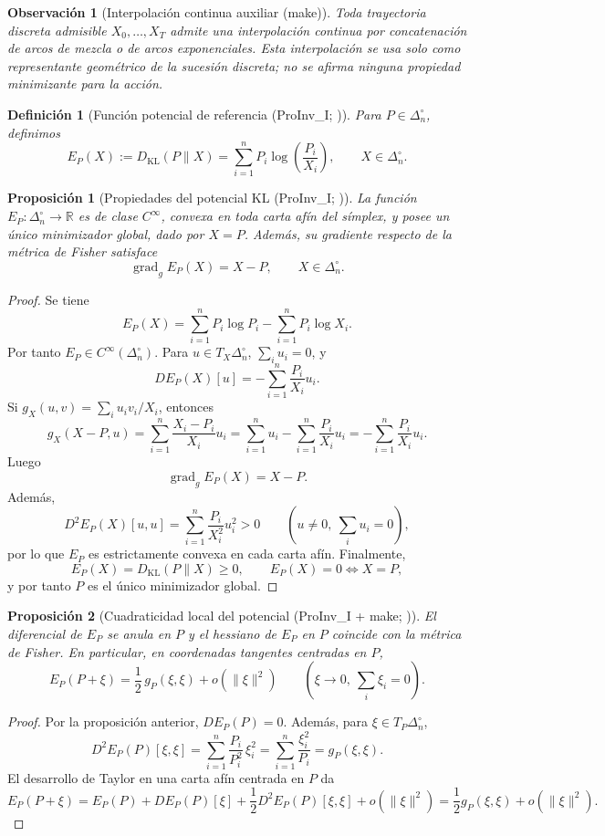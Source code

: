 ﻿\documentclass[12pt]{article}
\newcommand{\fuente}[1]{\textnormal{(#1)}}
\newcommand{\fuentecite}[2]{\textnormal{(#1; \citealp{#2})}}
\newcommand{\fuentemakecite}[2]{\textnormal{(#1 + make; \citealp{#2})}}
\newtheorem{definicion}{Definición}[section]
\newtheorem{proposicion}{Proposición}[section]
\newtheorem{observacion}{Observación}[section]
\begin{document}
\begin{observacion}[Interpolación continua auxiliar \fuente{make}]
Toda trayectoria discreta admisible \(X_0,\dots,X_T\) admite una interpolación continua por concatenación de arcos de mezcla o de arcos exponenciales. Esta interpolación se usa solo como representante geométrico de la sucesión discreta; no se afirma ninguna propiedad minimizante para la acción.
\end{observacion}

\begin{definicion}[Función potencial de referencia \fuentecite{ProInv\_I}{ControlInformacional2026}]
Para \(P\in\Delta_n^\circ\), definimos
\[
E_P(X):=D_{\mathrm{KL}}(P\|X)
=\sum_{i=1}^n P_i\log\!\left(\frac{P_i}{X_i}\right),
\qquad X\in\Delta_n^\circ.
\]
\end{definicion}

\begin{proposicion}[Propiedades del potencial KL \fuentecite{ProInv\_I}{ControlInformacional2026}]
La función \(E_P:\Delta_n^\circ\to\mathbb R\) es de clase \(C^\infty\), convexa en toda carta afín del símplex, y posee un único minimizador global, dado por \(X=P\). Además, su gradiente respecto de la métrica de Fisher satisface
\[
\operatorname{grad}_g E_P(X)=X-P,
\qquad X\in\Delta_n^\circ.
\]
\end{proposicion}
\begin{proof}
Se tiene
\[
E_P(X)=\sum_{i=1}^n P_i\log P_i-\sum_{i=1}^n P_i\log X_i.
\]
Por tanto \(E_P\in C^\infty(\Delta_n^\circ)\). Para \(u\in T_X\Delta_n^\circ\), \(\sum_i u_i=0\), y
\[
DE_P(X)[u]=-\sum_{i=1}^n \frac{P_i}{X_i}u_i.
\]
Si \(g_X(u,v)=\sum_i u_iv_i/X_i\), entonces
\[
g_X(X-P,u)=\sum_{i=1}^n \frac{X_i-P_i}{X_i}u_i
=\sum_{i=1}^n u_i-\sum_{i=1}^n \frac{P_i}{X_i}u_i
=-\sum_{i=1}^n \frac{P_i}{X_i}u_i.
\]
Luego
\[
\operatorname{grad}_g E_P(X)=X-P.
\]
Además,
\[
D^2E_P(X)[u,u]=\sum_{i=1}^n \frac{P_i}{X_i^2}u_i^2>0
\qquad(u\neq 0,\ \sum_i u_i=0),
\]
por lo que \(E_P\) es estrictamente convexa en cada carta afín. Finalmente,
\[
E_P(X)=D_{\mathrm{KL}}(P\|X)\ge 0,
\qquad
E_P(X)=0\iff X=P,
\]
y por tanto \(P\) es el único minimizador global.
\end{proof}

\begin{proposicion}[Cuadraticidad local del potencial \fuentemakecite{ProInv\_I}{ControlInformacional2026}]
El diferencial de \(E_P\) se anula en \(P\) y el hessiano de \(E_P\) en \(P\) coincide con la métrica de Fisher. En particular, en coordenadas tangentes centradas en \(P\),
\[
E_P(P+\xi)=\frac12\,g_P(\xi,\xi)+o(\|\xi\|^2)
\qquad (\xi\to 0,\ \sum_i \xi_i=0).
\]
\end{proposicion}
\begin{proof}
Por la proposición anterior, \(DE_P(P)=0\). Además, para \(\xi\in T_P\Delta_n^\circ\),
\[
D^2E_P(P)[\xi,\xi]
=\sum_{i=1}^n \frac{P_i}{P_i^2}\,\xi_i^2
=\sum_{i=1}^n \frac{\xi_i^2}{P_i}
=g_P(\xi,\xi).
\]
El desarrollo de Taylor en una carta afín centrada en \(P\) da
\[
E_P(P+\xi)
=E_P(P)+DE_P(P)[\xi]+\frac12 D^2E_P(P)[\xi,\xi]+o(\|\xi\|^2)
=\frac12 g_P(\xi,\xi)+o(\|\xi\|^2).
\]
\end{proof}
\end{document}
